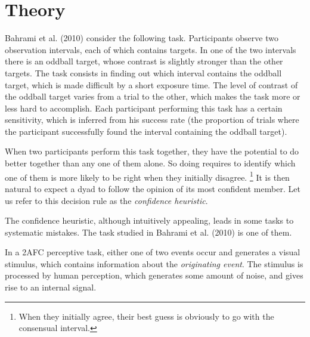 \documentclass[12pt]{report}
\begin{document}


\section{Theory}

Bahrami et al. (2010) consider the following task. Participants observe two observation intervals, each of which contains targets. In one of the two intervals there is an oddball target, whose contrast is slightly stronger than the other targets. The task consists in finding out which interval contains the oddball target, which is made difficult by a short exposure time. The level of contrast of the oddball target varies from a trial to the other, which makes the task more or less hard to accomplish. Each participant performing this task has a certain sensitivity, which is inferred from his success rate (the proportion of trials where the participant successfully found the interval containing the oddball target).

When two participants perform this task together, they have the potential to do better together than any one of them alone. So doing requires to identify which one of them is more likely to be right when they initially disagree. \footnote{When they initially agree, their best guess is obviously to go with the consensual interval.} It is then natural to expect a dyad to follow the opinion of its most confident member. Let us refer to this decision rule as the \textit{confidence heuristic}.

The confidence heuristic, although intuitively appealing, leads in some tasks to systematic mistakes. The task studied in Bahrami et al. (2010) is one of them. 

In a 2AFC perceptive task, either one of two events occur and generates a visual stimulus, which contains information about the \textit{originating event}. The stimulus is processed by human perception, which generates some amount of noise, and gives rise to an internal signal.
\end{document}
